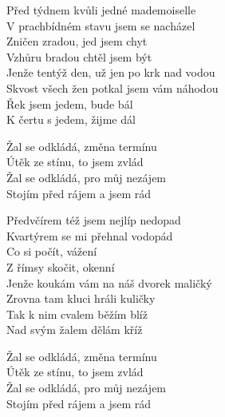 
\ve{}

Před týdnem kvůli jedné mademoiselle\\
V prachbídném stavu jsem se nacházel\\
Zničen zradou, jed jsem chyt\\
Vzhůru bradou chtěl jsem být\\
Jenže tentýž den, už jen po krk nad vodou\\
Skvost všech žen potkal jsem vám náhodou\\
Řek jsem jedem, bude bál\\
K čertu s jedem, žijme dál

\cho{}

Žal se odkládá, změna termínu\\
Útěk ze stínu, to jsem zvlád\\
Žal se odkládá, pro můj nezájem\\
Stojím před rájem a jsem rád

\ve{}

Předvčírem též jsem nejlíp nedopad\\
Kvartýrem se mi přehnal vodopád\\
Co si počít, vážení\\
Z římsy skočit, okenní\\
Jenže koukám vám na náš dvorek maličký\\
Zrovna tam kluci hráli kuličky\\
Tak k nim cvalem běžím blíž\\
Nad svým žalem dělám kříž

\cho{}

Žal se odkládá, změna termínu\\
Útěk ze stínu, to jsem zvlád\\
Žal se odkládá, pro můj nezájem\\
Stojím před rájem a jsem rád


\esong{}